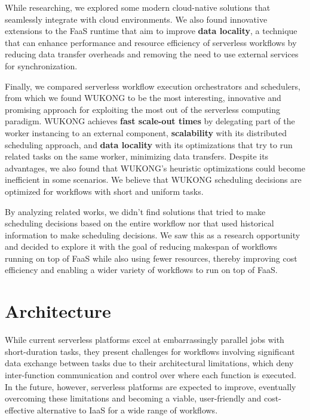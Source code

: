 \documentclass[conference]{IEEEtran}
\begin{document}
While researching, we explored some modern cloud-native solutions that seamlessly integrate with cloud environments. We also found innovative extensions to the FaaS runtime that aim to improve \textbf{data locality}, a technique that can enhance performance and resource efficiency of serverless workflows by reducing data transfer overheads and removing the need to use external services for synchronization.

Finally, we compared serverless workflow execution orchestrators and schedulers, from which we found WUKONG to be the most interesting, innovative and promising approach for exploiting the most out of the serverless computing paradigm. WUKONG achieves \textbf{fast scale-out times} by delegating part of the worker instancing to an external component, \textbf{scalability} with its distributed scheduling approach, and \textbf{data locality} with its optimizations that try to run related tasks on the same worker, minimizing data transfers. Despite its advantages, we also found that WUKONG's heuristic optimizations could become inefficient in some scenarios. We believe that WUKONG scheduling decisions are optimized for workflows with short and uniform tasks.

By analyzing related works, we didn't find solutions that tried to make scheduling decisions based on the entire workflow nor that used historical information to make scheduling decisions. We saw this as a research opportunity and decided to explore it with the goal of reducing makespan of workflows running on top of FaaS while also using fewer resources, thereby improving cost efficiency and enabling a wider variety of workflows to run on top of FaaS.


\section{Architecture}
\label{s:architecture}

While current serverless platforms excel at embarrassingly parallel jobs with short-duration tasks, they present challenges for workflows involving significant data exchange between tasks due to their architectural limitations, which deny inter-function communication and control over where each function is executed. In the future, however, serverless platforms are expected to improve, eventually overcoming these limitations and becoming a viable, user-friendly and cost-effective alternative to IaaS for a wide range of workflows.
\end{document}
